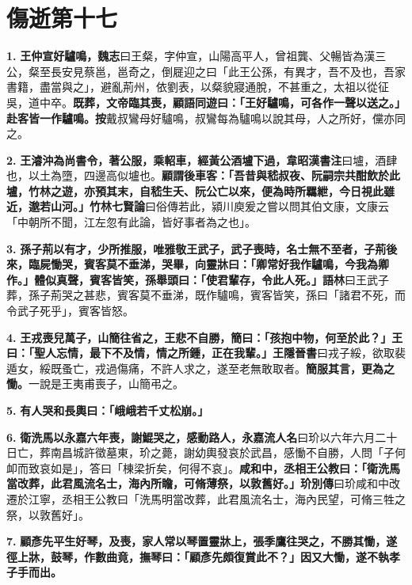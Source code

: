 \chapter{傷逝第十七}

\textbf{1.} \textbf{王仲宣好驢鳴，}{\footnotesize \textbf{魏志}曰王粲，字仲宣，山陽高平人，曾祖龔、父暢皆為漢三公，粲至長安見蔡邕，邕奇之，倒屣迎之曰「此王公孫，有異才，吾不及也，吾家書籍，盡當與之」，避亂荊州，依劉表，以粲貌寢通脫，不甚重之，太祖以從征吳，道中卒。}\textbf{既葬，文帝臨其喪，顧語同遊曰：「王好驢鳴，可各作一聲以送之。」赴客皆一作驢鳴。}{\footnotesize \textbf{按}戴叔鸞母好驢鳴，叔鸞每為驢鳴以說其母，人之所好，儻亦同之。}

\textbf{2.} \textbf{王濬沖為尚書令，著公服，乘軺車，經黃公酒壚下過，}{\footnotesize \textbf{韋昭漢書注}曰壚，酒肆也，以土為墮，四邊高似壚也。}\textbf{顧謂後車客：「吾昔與嵇叔夜、阮嗣宗共酣飲於此壚，竹林之遊，亦預其末，自嵇生夭、阮公亡以來，便為時所羈紲，今日視此雖近，邈若山河。」}{\footnotesize \textbf{竹林七賢論}曰俗傳若此，潁川庾爰之嘗以問其伯文康，文康云「中朝所不聞，江左忽有此論，皆好事者為之也」。}

\textbf{3.} \textbf{孫子荊以有才，少所推服，唯雅敬王武子，武子喪時，名士無不至者，子荊後來，臨屍慟哭，賓客莫不垂涕，哭畢，向靈牀曰：「卿常好我作驢鳴，今我為卿作。」體似真聲，賓客皆笑，孫舉頭曰：「使君輩存，令此人死。」}{\footnotesize \textbf{語林}曰王武子葬，孫子荊哭之甚悲，賓客莫不垂涕，既作驢鳴，賓客皆笑，孫曰「諸君不死，而令武子死乎」，賓客皆怒。}

\textbf{4.} \textbf{王戎喪兒萬子，山簡往省之，王悲不自勝，簡曰：「孩抱中物，何至於此？」王曰：「聖人忘情，最下不及情，情之所鍾，正在我輩。」}{\footnotesize \textbf{王隱晉書}曰戎子綏，欲取裴遁女，綏既蚤亡，戎過傷痛，不許人求之，遂至老無敢取者。}\textbf{簡服其言，更為之慟。}{\footnotesize 一說是王夷甫喪子，山簡弔之。}

\textbf{5.} \textbf{有人哭和長輿曰：「峨峨若千丈松崩。」}

\textbf{6.} \textbf{衛洗馬以永嘉六年喪，謝鯤哭之，感動路人，}{\footnotesize \textbf{永嘉流人名}曰玠以六年六月二十日亡，葬南昌城許徵墓東，玠之薨，謝幼輿發哀於武昌，感慟不自勝，人問「子何卹而致哀如是」，答曰「棟梁折矣，何得不哀」。}\textbf{咸和中，丞相王公教曰：「衛洗馬當改葬，此君風流名士，海內所瞻，可脩薄祭，以敦舊好。」}{\footnotesize \textbf{玠別傳}曰玠咸和中改遷於江寧，丞相王公教曰「洗馬明當改葬，此君風流名士，海內民望，可脩三牲之祭，以敦舊好」。}

\textbf{7.} \textbf{顧彥先平生好琴，及喪，家人常以琴置靈牀上，張季鷹往哭之，不勝其慟，遂徑上牀，鼓琴，作數曲竟，撫琴曰：「顧彥先頗復賞此不？」因又大慟，遂不執孝子手而出。}

